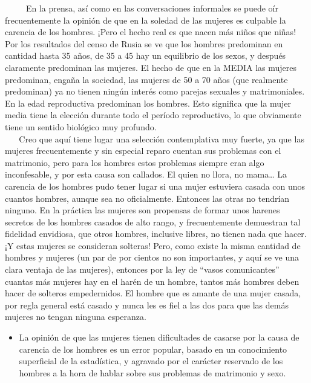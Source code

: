 ~ ~ ~ En la prensa, así como en las conversaciones informales se puede
oír frecuentemente la opinión de que en la soledad de las mujeres es
culpable la carencia de los hombres. ¡Pero el hecho real es que nacen
más niños que niñas! Por los resultados del censo de Rusia se ve que los
hombres predominan en cantidad hasta 35 años, de 35 a 45 hay un
equilibrio de los sexos, y después claramente predominan las mujeres. El
hecho de que en la MEDIA las mujeres predominan, engaña la sociedad, las
mujeres de 50 a 70 años (que realmente predominan) ya no tienen ningún
interés como parejas sexuales y matrimoniales. En la edad reproductiva
predominan los hombres. Esto significa que la mujer media tiene la
elección durante todo el período reproductivo, lo que obviamente tiene
un sentido biológico muy profundo.\\
\hspace*{0.333em} ~ ~ Creo que aquí tiene lugar una selección
contemplativa muy fuerte, ya que las mujeres frecuentemente y sin
especial reparo cuentan sus problemas con el matrimonio, pero para los
hombres estos problemas siempre eran algo inconfesable, y por esta causa
son callados. El quien no llora, no mama\ldots{} La carencia de los
hombres pudo tener lugar si una mujer estuviera casada con unos cuantos
hombres, aunque sea no oficialmente. Entonces las otras no tendrían
ninguno. En la práctica las mujeres son propensas de formar unos harenes
secretos de los hombres casados de alto rango, y frecuentemente
demuestran tal fidelidad envidiosa, que otros hombres, inclusive libres,
no tienen nada que hacer. ¡Y estas mujeres se consideran solteras! Pero,
como existe la misma cantidad de hombres y mujeres (un par de por
cientos no son importantes, y aquí se ve una clara ventaja de las
mujeres), entonces por la ley de ``vasos comunicantes'' cuantas más
mujeres hay en el harén de un hombre, tantos más hombres deben hacer de
solteros empedernidos. El hombre que es amante de una mujer casada, por
regla general está casado y nunca les es fiel a las dos para que las
demás mujeres no tengan ninguna esperanza.

\begin{itemize}

\item
  La opinión de que las mujeres tienen dificultades de casarse por la
  causa de carencia de los hombres es un error popular, basado en un
  conocimiento superficial de la estadística, y agravado por el carácter
  reservado de los hombres a la hora de hablar sobre sus problemas de
  matrimonio y sexo.
\end{itemize}

